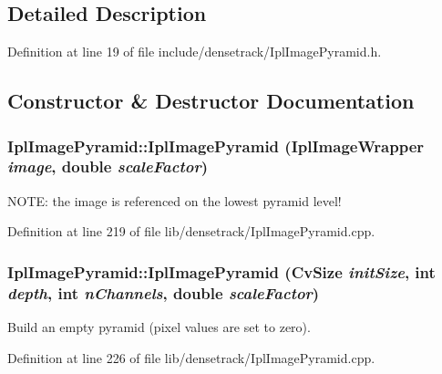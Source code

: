 \subsection{Detailed Description}


Definition at line 19 of file include/densetrack/IplImagePyramid.h.



\subsection{Constructor \& Destructor Documentation}
\hypertarget{class_ipl_image_pyramid_a6d41d348cdfaea6e4444b1fdd523f555}{
\subsubsection[{IplImagePyramid}]{\setlength{\rightskip}{0pt plus 5cm}IplImagePyramid::IplImagePyramid ({\bf IplImageWrapper} {\em image}, \/  double {\em scaleFactor})}}
\label{class_ipl_image_pyramid_a6d41d348cdfaea6e4444b1fdd523f555}
NOTE: the image is referenced on the lowest pyramid level! 

Definition at line 219 of file lib/densetrack/IplImagePyramid.cpp.

\hypertarget{class_ipl_image_pyramid_a817d4a60ac96b844a97df0fa1bc52a5e}{
\subsubsection[{IplImagePyramid}]{\setlength{\rightskip}{0pt plus 5cm}IplImagePyramid::IplImagePyramid (CvSize {\em initSize}, \/  int {\em depth}, \/  int {\em nChannels}, \/  double {\em scaleFactor})}}
\label{class_ipl_image_pyramid_a817d4a60ac96b844a97df0fa1bc52a5e}
Build an empty pyramid (pixel values are set to zero). 

Definition at line 226 of file lib/densetrack/IplImagePyramid.cpp.

